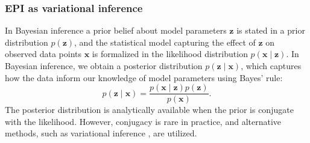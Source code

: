 \documentclass[11pt]{article}
\begin{document}
\subsubsection{EPI as variational inference}\label{methods_VI}
In Bayesian inference a prior belief about model parameters $\mathbf{z}$ is stated in a prior distribution $p(\mathbf{z})$, and the statistical model capturing the effect of $\mathbf{z}$ on observed data points $\mathbf{x}$ is formalized in the likelihood distribution $p(\mathbf{x} \mid \mathbf{z})$.
In Bayesian inference, we obtain a posterior distribution $p(\mathbf{z} \mid \mathbf{x})$, which captures how the data inform our knowledge of model parameters using Bayes' rule:
\begin{equation}
p(\mathbf{z} \mid \mathbf{x}) = \frac{p(\mathbf{x} \mid \mathbf{z}) p(\mathbf{z})}{p(\mathbf{x})}.
\end{equation}
The posterior distribution is analytically available when the prior is conjugate with the likelihood.
However, conjugacy is rare in practice, and alternative methods, such as variational inference \cite{saul1998mean}, are utilized.
\end{document}
